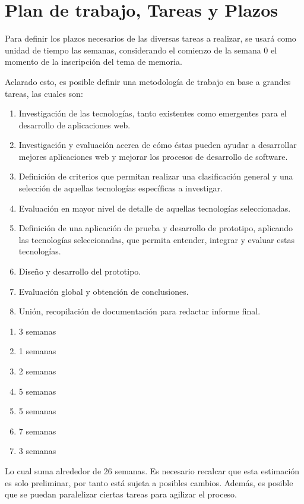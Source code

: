 \section{Plan de trabajo, Tareas y Plazos}

Para definir los plazos necesarios de las diversas tareas a realizar, se usará como unidad de tiempo las semanas,
considerando el comienzo de la semana $0$ el momento de la inscripción del tema de memoria.

Aclarado esto, es posible definir una metodología de trabajo en base a grandes tareas, las cuales son:

\begin{enumerate}
 \item Investigación de las tecnologías, tanto existentes como emergentes para el desarrollo de aplicaciones web.
 \item Investigación y evaluación acerca de cómo éstas pueden ayudar a desarrollar mejores aplicaciones web y 
	mejorar los procesos de desarrollo de software.
 \item Definición de criterios que permitan realizar una clasificación general y una selección de aquellas 
	tecnologías específicas a investigar.
 \item Evaluación en mayor nivel de detalle de aquellas tecnologías seleccionadas.
 \item Definición de una aplicación de prueba y desarrollo de prototipo, aplicando las tecnologías seleccionadas, que permita entender, 
	integrar y evaluar estas tecnologías. 
 \item Diseño y desarrollo del prototipo.
 \item Evaluación global y obtención de conclusiones.
 \item Unión, recopilación de documentación para redactar informe final.
\end{enumerate}

\begin{enumerate}
 \item 3 semanas
 \item 1 semanas
 \item 2 semanas
 \item 5 semanas
 \item 5 semanas
 \item 7 semanas
 \item 3 semanas
\end{enumerate}

Lo cual suma alrededor de 26 semanas. Es necesario recalcar que esta estimación es solo preliminar, por tanto está sujeta
a posibles cambios. Además, es posible que se puedan paralelizar ciertas tareas para agilizar el proceso.


